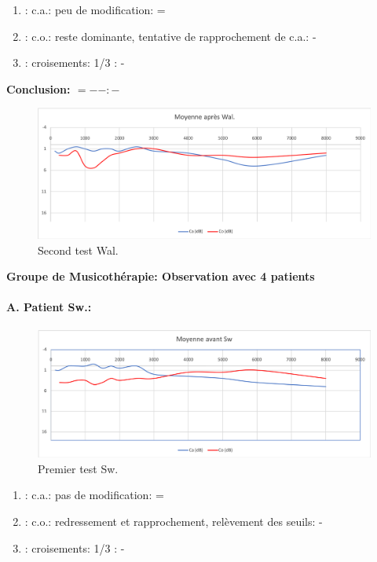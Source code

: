 	\begin{enumerate}

 		\item : c.a.: peu de modification: =

 		\item : c.o.: reste dominante, tentative de rapprochement de c.a.: -
 		\item : croisements: 1/3 :  -

                \end{enumerate}

                \textbf{ Conclusion:  $= -  -        : -$ }

               \begin{figure}
\centering
\includegraphics[width=0.7\linewidth]{images/graphiques/wal_post.png}
\caption[Moyenne OG+OD]{Second test Wal.}

\label{groupecontroleimage1}
\end{figure}

  \textbf{ Groupe de Musicothérapie: Observation avec 4 patients}

\paragraph{ A. Patient Sw.:}



 \begin{figure}[th]
\centering
\includegraphics[width=0.7\linewidth]{images/graphiques/sw_pre.png}
\caption[Moyenne OG+OD]{Premier test Sw.}

\end{figure}

	\begin{enumerate}

 		\item : c.a.: pas de modification: = %

 		\item : c.o.: redressement et rapprochement,
                  relèvement des seuils: -       %
 		\item : croisements: 1/3 :  -

                \end{enumerate}

